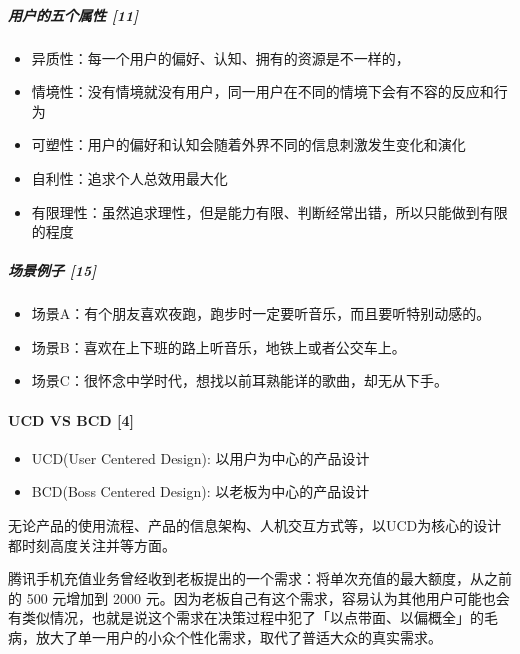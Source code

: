 \documentclass[letterpaper,10pt,english]{sphinxmanual}
\begin{document}
\subparagraph{用户的五个属性 {[}11{]}}
\label{\detokenize{chapter_knowledge/users_analysis:id4}}\begin{itemize}
\item {} 
异质性：每一个用户的偏好、认知、拥有的资源是不一样的，

\item {} 
情境性：没有情境就没有用户，同一用户在不同的情境下会有不容的反应和行为

\item {} 
可塑性：用户的偏好和认知会随着外界不同的信息刺激发生变化和演化

\item {} 
自利性：追求个人总效用最大化

\item {} 
有限理性：虽然追求理性，但是能力有限、判断经常出错，所以只能做到有限的程度

\end{itemize}


\subparagraph{场景例子 {[}15{]}}
\label{\detokenize{chapter_knowledge/users_analysis:id5}}\begin{itemize}
\item {} 
场景A：有个朋友喜欢夜跑，跑步时一定要听音乐，而且要听特别动感的。

\item {} 
场景B：喜欢在上下班的路上听音乐，地铁上或者公交车上。

\item {} 
场景C：很怀念中学时代，想找以前耳熟能详的歌曲，却无从下手。

\end{itemize}


\paragraph{UCD VS BCD {[}4{]}}
\label{\detokenize{chapter_knowledge/users_analysis:ucd-vs-bcd-4}}\begin{itemize}
\item {} 
UCD(User Centered Design): 以用户为中心的产品设计

\item {} 
BCD(Boss Centered Design): 以老板为中心的产品设计

\end{itemize}

无论产品的使用流程、产品的信息架构、人机交互方式等，以UCD为核心的设计都时刻高度关注并等方面。

腾讯手机充值业务曾经收到老板提出的一个需求：将单次充值的最大额度，从之前的
500 元增加到 2000
元。因为老板自己有这个需求，容易认为其他用户可能也会有类似情况，也就是说这个需求在决策过程中犯了「以点带面、以偏概全」的毛病，放大了单一用户的小众个性化需求，取代了普适大众的真实需求。
\end{document}
